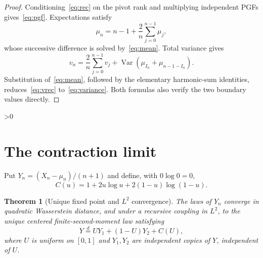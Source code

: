 \documentclass[10pt]{article}
\providecommand{\CRevisionRound}{2}
\newtheorem{theorem}{Theorem}
\newcommand{\Var}{\operatorname{Var}}
\begin{document}
\begin{proof}
Conditioning~\eqref{eq:rec} on the pivot rank and multiplying independent
PGFs gives~\eqref{eq:pgf}.  Expectations satisfy
\begin{equation}\label{eq:mrec}
 \mu_n=n-1+\frac2n\sum_{j=0}^{n-1}\mu_j,
\end{equation}
whose successive difference is solved by~\eqref{eq:mean}.  Total variance
gives
\begin{equation}\label{eq:vrec}
 v_n=\frac2n\sum_{j=0}^{n-1}v_j
 +\Var\!\left(\mu_{I_n}+\mu_{n-1-I_n}\right).
\end{equation}
Substitution of~\eqref{eq:mean}, followed by the elementary harmonic-sum
identities, reduces~\eqref{eq:vrec} to~\eqref{eq:variance}.  Both formulas
also verify the two boundary values directly.
\end{proof}

\ifnum\CRevisionRound>0
\section{The contraction limit}
Put $Y_n=(X_n-\mu_n)/(n+1)$ and define, with $0\log0=0$,
\begin{equation}\label{eq:toll}
 C(u)=1+2u\log u+2(1-u)\log(1-u).
\end{equation}

\begin{theorem}[Unique fixed point and $L^2$ convergence]\label{thm:limit}
The laws of $Y_n$ converge in quadratic Wasserstein distance, and under a
recursive coupling in $L^2$, to the unique centered finite-second-moment law
satisfying
\begin{equation}\label{eq:fixed}
 Y\mathrel{\mathop=\limits^d} UY_1+(1-U)Y_2+C(U),
\end{equation}
where $U$ is uniform on $[0,1]$ and $Y_1,Y_2$ are independent copies of $Y$,
independent of $U$.
\end{theorem}
\end{document}

